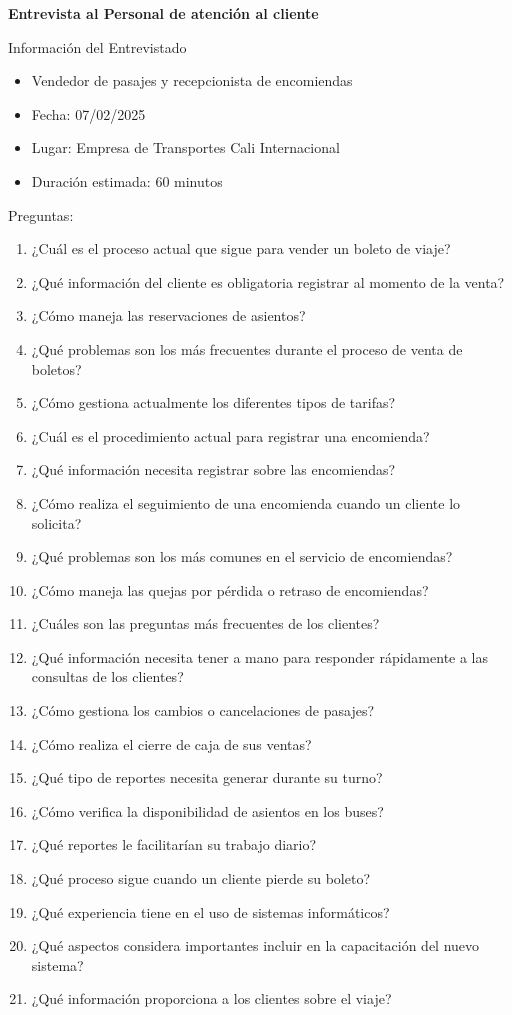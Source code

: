 	\textbf{Entrevista al Personal de atención al cliente}
		
	Información del Entrevistado
	\begin{itemize}[label=$-$, left=0cm, labelsep = 0.9cm, topsep = 0pt, parsep = 0pt]
		\item Vendedor de pasajes y recepcionista de encomiendas
		\item Fecha: 07/02/2025
		\item Lugar: Empresa de Transportes Cali Internacional
		\item Duración estimada: 60 minutos
	\end{itemize}
	
	Preguntas:
	
	\begin{enumerate}[left=0.1cm, labelsep = 0.9cm, topsep = 0pt, parsep = 0pt]
		\item ¿Cuál es el proceso actual que sigue para vender un boleto de viaje?
		\item ¿Qué información del cliente es obligatoria registrar al momento de la venta?
		\item ¿Cómo maneja las reservaciones de asientos?
		\item ¿Qué problemas son los más frecuentes durante el proceso de venta de boletos?
		\item ¿Cómo gestiona actualmente los diferentes tipos de tarifas?
		\item ¿Cuál es el procedimiento actual para registrar una encomienda?
		\item ¿Qué información necesita registrar sobre las encomiendas?
		\item ¿Cómo realiza el seguimiento de una encomienda cuando un cliente lo solicita?
		\item ¿Qué problemas son los más comunes en el servicio de encomiendas?
		\item ¿Cómo maneja las quejas por pérdida o retraso de encomiendas?
		\item ¿Cuáles son las preguntas más frecuentes de los clientes?
		\item ¿Qué información necesita tener a mano para responder rápidamente a las consultas de los clientes?
		\item ¿Cómo gestiona los cambios o cancelaciones de pasajes?
		\item ¿Cómo realiza el cierre de caja de sus ventas?
		\item ¿Qué tipo de reportes necesita generar durante su turno?
		\item ¿Cómo verifica la disponibilidad de asientos en los buses?
		\item ¿Qué reportes le facilitarían su trabajo diario?
		\item ¿Qué proceso sigue cuando un cliente pierde su boleto?
		\item ¿Qué experiencia tiene en el uso de sistemas informáticos?
		\item ¿Qué aspectos considera importantes incluir en la capacitación del nuevo sistema?
		\item ¿Qué información proporciona a los clientes sobre el viaje?
	\end{enumerate}
	
